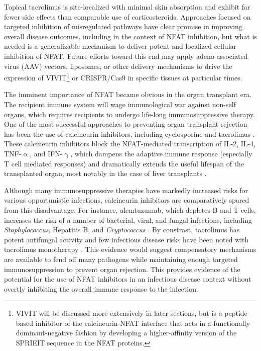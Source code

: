 Topical tacrolimus is site\hyp{}localized with minimal skin absorption and exhibit far fewer side effects than comparable use of corticosteroids. Approaches focused on targeted inhibition of misregulated pathways have clear promise in improving overall disease outcomes, including in the context of NFAT inhibition, but what is needed is a generalizable mechanism to deliver potent and localized cellular inhibition of NFAT. Future efforts toward this end may apply adeno\hyp{}associated virus (AAV) vectors, liposomes, or other delivery mechanisms to drive the expression of VIVIT\footnote{VIVIT will be discussed more extensively in later sections, but is a peptide\hyp{}based inhibitor of the calcineurin\hyp{}NFAT interface that acts in a functionally dominant\hyp{}negative fashion by developing a higher\hyp{}affinity version of the SPRIEIT sequence in the NFAT proteins.} or CRISPR/Cas9 in specific tissues at particular times.

The imminent importance of NFAT became obvious in the organ transplant era. The recipient immune system will wage immunological war against non\hyp{}self organs, which requires recipients to undergo life\hyp{}long immunosuppressive therapy. One of the most successful approaches to preventing organ transplant rejection has been the use of calcineurin inhibitors, including cyclosporine and tacrolimus \citep{Ellis1995, Scott2003, Mihatsch1998, Lerut2008}. These calcineurin inhibitors block the NFAT\hyp{}mediated transcription of IL\hyp{}2, IL\hyp{}4, TNF\hyp{}$\upalpha$, and IFN\hyp{}$\upgamma$, which dampens the adaptive immune response (especially T cell mediated responses) and dramatically extends the useful lifespan of the transplanted organ, most notably in the case of liver transplants \citep{McCaffrey1993, Moench2007}. 

Although many immunosuppressive therapies have markedly increased risks for various opportunistic infections, calcineurin inhibitors are comparatively spared from this disadvantage. For instance, alemtuzumab, which depletes B and T cells, increases the risk of a number of bacterial, viral, and fungal infections, including \textit{Staphylococcus}, Hepatitis B, and \textit{Cryptococcus} \citep{Harris2021, Fishman2007}. By constrast, tacrolimus has potent antifungal activity and few infectious disease risks have been noted with tacrolimus monotherapy \citep{Singh2016b, Gong2021, Papon2021, McAlister2006, Emal2019}. This evidence would suggest compensatory mechanisms are available to fend off many pathogens while maintaining enough targeted immunosuppression to prevent organ rejection. This provides evidence of the potential for the use of NFAT inhibitors in an infectious disease context without overtly inhibiting the overall immune response to the infection. 

